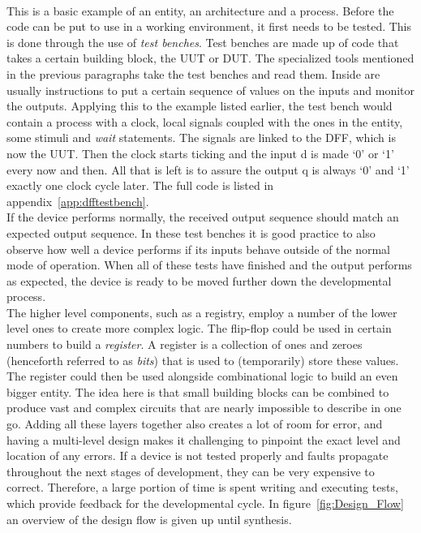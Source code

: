 \documentclass[11pt,british]{article}
\begin{document}
\\[\baselineskip]
This is a basic example of an entity, an architecture and a process. Before the code can be put to use in a working environment, it first needs to be tested. This is done through the use of \emph{test benches}.\cite{bergeron00} Test benches are made up of code that takes a certain building block, the \gls{UUT} or \gls{DUT}. The specialized tools mentioned in the previous paragraphs take the test benches and read them. Inside are usually instructions to put a certain sequence of values on the inputs and monitor the outputs.\cite{vhdltestbench} Applying this to the example listed earlier, the test bench would contain a process with a clock, local signals coupled with the ones in the entity, some stimuli and \emph{wait} statements. The signals are linked to the DFF, which is now the UUT. Then the clock starts ticking and the input d is made `0' or `1' every now and then. All that is left is to assure the output q is always `0' and `1' exactly one clock cycle later. The full code is listed in appendix~\ref{app:dfftestbench}.
\\[\baselineskip]
If the device performs normally, the received output sequence should match an expected output sequence. In these test benches it is good practice to also observe how well a device performs if its inputs behave outside of the normal mode of operation. When all of these tests have finished and the output performs as expected, the device is ready to be moved further down the developmental process.\cite{vhdldebug}
\\[\baselineskip]
The higher level components, such as a registry, employ a number of the lower level ones to create more complex logic.\cite{vhdlsynth3} The flip-flop could be used in certain numbers to build a \emph{register}. A register is a collection of ones and zeroes (henceforth referred to as \emph{bits}) that is used to (temporarily) store these values. The register could then be used alongside combinational logic to build an even bigger entity. The idea here is that small building blocks can be combined to produce vast and complex circuits that are nearly impossible to describe in one go.\cite{vhdlhierarchy} Adding all these layers together also creates a lot of room for error, and having a multi-level design makes it challenging to pinpoint the exact level and location of any errors. If a device is not tested properly and faults propagate throughout the next stages of development, they can be very expensive to correct.\cite{weber06} Therefore, a large portion of time is spent writing and executing tests, which provide feedback for the developmental cycle. In figure~\ref{fig:Design_Flow} an overview of the design flow is given up until synthesis.
\end{document}
